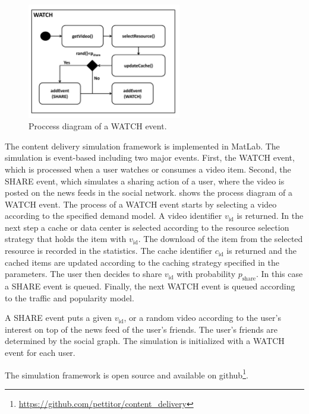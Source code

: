 \begin{figure}[bt]
  \centering
  \includegraphics[width=0.6\textwidth]{hierarchical/simulative/figures/watch}
  \caption{Proccess diagram of a WATCH event.}
  \label{fig:WATCH}
\end{figure}

The content delivery simulation framework is implemented in MatLab.
The simulation is event-based including two major events.
First, the WATCH event, which is processed when a user watches or consumes a video item.
Second, the SHARE event, which simulates a sharing action of a user, where the video is posted on the news feeds in the social network.
 shows the process diagram of a WATCH event.
The process of a WATCH event starts by selecting a video according to the specified demand model.
A video identifier $v_\text{id}$ is returned.
In the next step a cache or data center is selected according to the resource selection strategy that holds the item with $v_\text{id}$.
The download of the item from the selected resource is recorded in the statistics.
The cache identifier $c_\text{id}$ is returned and the cached items are updated according to the caching strategy specified in the parameters.
The user then decides to share $v_\text{id}$ with probability $p_\text{share}$.
In this case a SHARE event is queued.
Finally, the next WATCH event is queued according to the traffic and popularity model.

A SHARE event puts a given $v_\text{id}$, or a random video according to the user's interest on top of the news feed of the user's friends.
The user's friends are determined by the social graph.
The simulation is initialized with a WATCH event for each user.

The simulation framework is open source and available on github\footnote{\url{https://github.com/pettitor/content_delivery}}.
